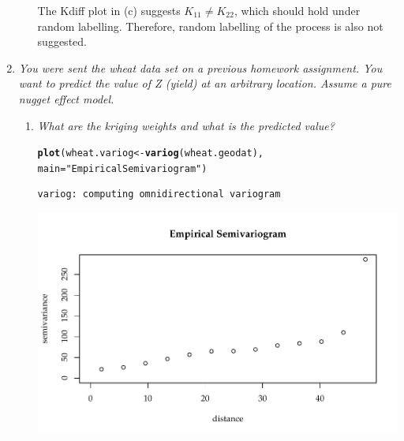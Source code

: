 \documentclass{article}\usepackage[]{graphicx}\usepackage[]{color}
\makeatletter
\def\maxwidth{ %
  \ifdim\Gin@nat@width>\linewidth
    \linewidth
  \else
    \Gin@nat@width
  \fi
}
\newcommand{\hlstr}[1]{\textcolor[rgb]{0.192,0.494,0.8}{#1}}%
\newcommand{\hlstd}[1]{\textcolor[rgb]{0.345,0.345,0.345}{#1}}%
\newcommand{\hlkwb}[1]{\textcolor[rgb]{0.69,0.353,0.396}{#1}}%
\newcommand{\hlkwc}[1]{\textcolor[rgb]{0.333,0.667,0.333}{#1}}%
\newcommand{\hlkwd}[1]{\textcolor[rgb]{0.737,0.353,0.396}{\textbf{#1}}}%
\newenvironment{kframe}{%
 \def\at@end@of@kframe{}%
 \ifinner\ifhmode%
  \def\at@end@of@kframe{\end{minipage}}%
  \begin{minipage}{\columnwidth}%
 \fi\fi%
 \def\FrameCommand##1{\hskip\@totalleftmargin \hskip-\fboxsep
 \colorbox{shadecolor}{##1}\hskip-\fboxsep
     \hskip-\linewidth \hskip-\@totalleftmargin \hskip\columnwidth}%
 \MakeFramed {\advance\hsize-\width
   \@totalleftmargin\z@ \linewidth\hsize
   \@setminipage}}%
 {\par\unskip\endMakeFramed%
 \at@end@of@kframe}
\newenvironment{knitrout}{}{} %
\makeatother
\begin{document}
\begin{enumerate}
\begin{enumerate}
The Kdiff plot in (c) suggests $K_{11} \neq K_{22}$, which should hold under random labelling. Therefore, random labelling of the process is also not suggested.


\end{enumerate}

\item %
{\it You were sent the wheat data set on a previous homework assignment. You want to predict the value of Z (yield) at an arbitrary location. Assume a pure nugget effect model.}

\begin{enumerate}
\item %
{\it What are the kriging weights and what is the predicted value?}

\begin{knitrout}\footnotesize
{}\color{fgcolor}\begin{kframe}
\begin{alltt}
\hlkwd{plot}\hlstd{(wheat.variog} \hlkwb{<-} \hlkwd{variog}\hlstd{(wheat.geodat),}
     \hlkwc{main} \hlstd{=} \hlstr{"Empirical Semivariogram"}\hlstd{)}
\end{alltt}
\begin{verbatim}
variog: computing omnidirectional variogram
\end{verbatim}
\end{kframe}

{\centering \includegraphics[width=\maxwidth]{figure/prob4a-1} 

}
\end{knitrout}
\end{enumerate}
\end{enumerate}
\end{document}
